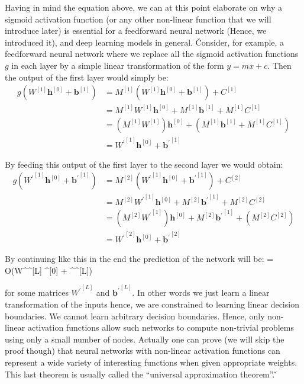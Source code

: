 Having in mind the equation above, we can at this point elaborate on why a sigmoid activation function (or any other
non-linear function that we will introduce later) is essential for a feedforward neural network (Hence, we introduced
it), and deep learning models in general. \v

Consider, for example, a feedforward neural network where we replace all the sigmoid activation functions $g$ in each
layer by a simple linear transformation of the form $y= mx + c$. Then the output of the first layer would simply be:
\begingroup
\allowdisplaybreaks
\begin{align*}
g(W^{[1]} \boldsymbol{h}^{[0]} + \boldsymbol{b}^{[1]})
&= M^{[1]}(W^{[1]} \boldsymbol{h}^{[0]} + \boldsymbol{b}^{[1]}) + C^{[1]} \\
&= M^{[1]} W^{[1]} \boldsymbol{h}^{[0]} + M^{[1]} \boldsymbol{b}^{[1]} + M^{[1]} C^{[1]} \\
&= (M^{[1]} W^{[1]}) \boldsymbol{h}^{[0]} + (M^{[1]} \boldsymbol{b}^{[1]} + M^{[1]} C^{[1]}) \\
& = {W^\prime}^{[1]} \boldsymbol{h}^{[0]} + {\boldsymbol{b}^\prime}^{[1]}
\end{align*}
\endgroup

By feeding this output of the first layer to the second layer we would obtain:
\begin{align*}
g({W^\prime}^{[1]} \boldsymbol{h}^{[0]} + {\boldsymbol{b}^\prime}^{[1]})
&= M^{[2]} ({W^\prime}^{[1]} \boldsymbol{h}^{[0]} + {\boldsymbol{b}^\prime}^{[1]}) + C^{[2]} \\
&= M^{[2]} {W^\prime}^{[1]} \boldsymbol{h}^{[0]} + M^{[2]}{\boldsymbol{b}^\prime}^{[1]} + M^{[2]} C^{[2]} \\
&= (M^{[2]} {W^\prime}^{[1]}) \boldsymbol{h}^{[0]} + M^{[2]}{\boldsymbol{b}^\prime}^{[1]} + (M^{[2]} C^{[2]}) \\
& = {W^\prime}^{[2]} \boldsymbol{h}^{[0]} + {\boldsymbol{b}^\prime}^{[2]}
\end{align*}

By continuing like this in the end the prediction of the network will be:
\bse
{} = O({W^\prime}^{[L]} ^{[0]} + {^\prime}^{[L]})
\ese

for some matrices ${W^\prime}^{[L]}$ and ${\boldsymbol{b}^\prime}^{[L]}$. In other words we just learn a linear
transformation of the inputs hence, we are constrained to learning linear decision boundaries. We cannot learn
arbitrary decision boundaries. Hence, only non-linear activation functions allow such networks to compute non-trivial
problems using only a small number of nodes. Actually one can prove (we will skip the proof though) that neural
networks with non-linear activation functions can represent a wide variety of interesting functions when given
appropriate weights. This last theorem is usually called the ``universal approximation theorem''. \v

